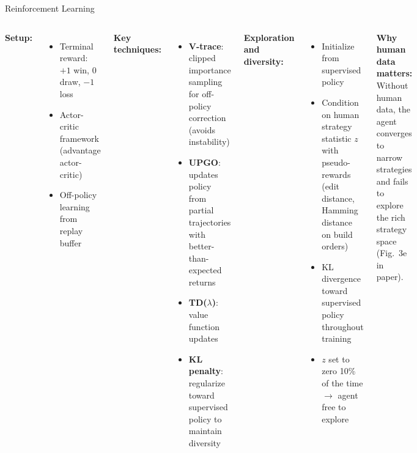 \documentclass[aspectratio=169]{beamer}
\begin{document}
\begin{frame}{Reinforcement Learning}
\begin{columns}[T]
\textbf{Setup:}
\begin{itemize}
    \item Terminal reward: $+1$ win, $0$ draw, $-1$ loss
    \item Actor-critic framework (advantage actor-critic)
    \item Off-policy learning from replay buffer
\end{itemize}

\vspace{0.3em}
\textbf{Key techniques:}
\begin{itemize}
    \item \textbf{V-trace}: clipped importance sampling for off-policy correction (avoids instability)
    \item \textbf{UPGO}: updates policy from partial trajectories with better-than-expected returns
    \item \textbf{TD($\lambda$)}: value function updates
    \item \textbf{KL penalty}: regularize toward supervised policy to maintain diversity
\end{itemize}

\textbf{Exploration and diversity:}
\begin{itemize}
    \item Initialize from supervised policy
    \item Condition on human strategy statistic $z$ with pseudo-rewards (edit distance, Hamming distance on build orders)
    \item KL divergence toward supervised policy throughout training
    \item $z$ set to zero 10\% of the time $\to$ agent free to explore
\end{itemize}

\vspace{0.3em}
\textbf{Why human data matters:}\\
Without human data, the agent converges to narrow strategies and fails to explore the rich strategy space (Fig.~3e in paper).
\end{columns}
\end{frame}
\end{document}
